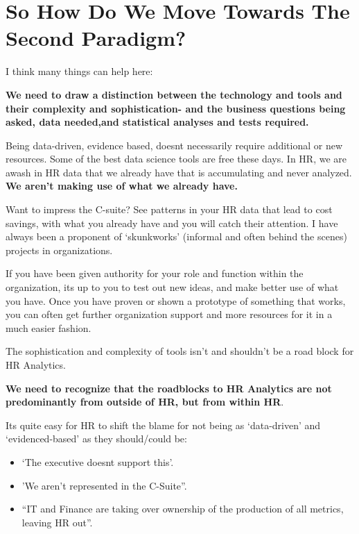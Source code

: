 \documentclass[12pt,letterpaper]{article}
\begin{document}
\section{So How Do We Move Towards The Second
Paradigm?}\label{so-how-do-we-move-towards-the-second-paradigm}

I think many things can help here:

\textbf{We need to draw a distinction between the technology and tools
and their complexity and sophistication- and the business questions
being asked, data needed,and statistical analyses and tests required.}

Being data-driven, evidence based, doesnt necessarily require additional
or new resources. Some of the best data science tools are free these
days. In HR, we are awash in HR data that we already have that is
accumulating and never analyzed. \textbf{We aren't making use of what we
already have.}

Want to impress the C-suite? See patterns in your HR data that lead to
cost savings, with what you already have and you will catch their
attention. I have always been a proponent of `skunkworks' (informal and
often behind the scenes) projects in organizations.

If you have been given authority for your role and function within the
organization, its up to you to test out new ideas, and make better use
of what you have. Once you have proven or shown a prototype of something
that works, you can often get further organization support and more
resources for it in a much easier fashion.

The sophistication and complexity of tools isn't and shouldn't be a road
block for HR Analytics.

\textbf{We need to recognize that the roadblocks to HR Analytics are not
predominantly from outside of HR, but from within HR}.

Its quite easy for HR to shift the blame for not being as `data-driven'
and `evidenced-based' as they should/could be:

\begin{itemize}

\item
  `The executive doesnt support this'.
\item
  'We aren't represented in the C-Suite''.
\item
  ``IT and Finance are taking over ownership of the production of all
  metrics, leaving HR out''.
\end{itemize}
\end{document}
